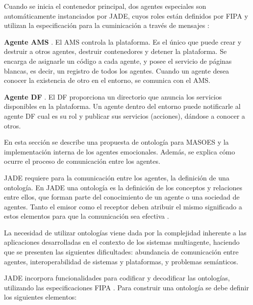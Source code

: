 Cuando se inicia el contenedor principal, dos agentes especiales son automáticamente
instanciados por JADE, cuyos roles están definidos por FIPA y utilizan
la especificación  para la cuminicación a través de mensajes
\citep{fipaAgentManagement}:

\textbf{Agente AMS} . El AMS  controla la plataforma.
Es el único que puede crear y destruir a otros agentes, destruir contenedores y detener la plataforma.
Se encarga de asignarle un código a cada agente, y posee el servicio de páginas blancas, es decir,
un registro de todos los agentes. Cuando un agente desea conocer la existencia de otro
en el entorno, se comunica con el AMS.

\textbf{Agente DF} . El DF proporciona un directorio que
anuncia los servicios disponibles en la plataforma.
Un agente dentro del
entorno puede notificarle al agente DF cual es su rol y publicar
sus servicios (acciones), dándose a conocer a otros.


\label{propuesta-nivel-individual}

En esta sección se describe una propuesta de ontología para MASOES
y la implementación interna de los agentes emocionales.
Además, se explica cómo ocurre el proceso de comunicación entre los agentes.


\label{propuesta-ontologia}

JADE requiere para la comunicación entre los agentes, la definición de una ontología.
En JADE una ontología es la definición de los conceptos y relaciones entre ellos, que forman parte
del conocimiento de un agente o una sociedad de agentes. Tanto el emisor como el receptor deben atribuir el
mismo significado a estos elementos para que la comunicación sea efectiva \citep{bellifemine2007developing}.

La necesidad de utilizar ontologías viene dada por la complejidad inherente a
las aplicaciones desarrolladas en el contexto de los sistemas multiagente, haciendo
que se presenten las siguientes dificultades: abundancia de comunicación
entre agentes, interoperabilidad de sistemas y plataformas, y problemas
semánticos.

JADE incorpora funcionalidades para codificar y decodificar las ontologías,
utilizando las especificaciones FIPA \citep{fipaOntology, fipaLanguage}.
Para construir una ontología se debe definir los siguientes elementos:

